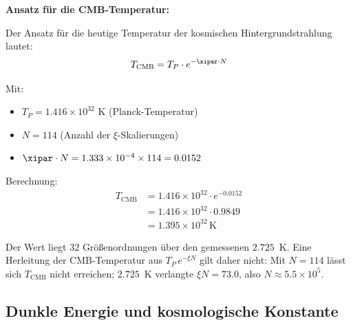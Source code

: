 	\begin{anwendung}
		\textbf{Ansatz für die CMB-Temperatur:}

		Der Ansatz für die heutige Temperatur der kosmischen Hintergrundstrahlung lautet:
		\begin{equation}
			T_{\text{CMB}} = T_P \cdot e^{-\xipar \cdot N}
		\end{equation}
		
		Mit:
		\begin{itemize}
			\item $T_P = 1.416 \times 10^{32}$ K (Planck-Temperatur)
			\item $N = 114$ (Anzahl der $\xi$-Skalierungen)
			\item $\xipar \cdot N = 1.333 \times 10^{-4} \times 114 = 0.0152$
		\end{itemize}
		
		Berechnung:
		\begin{align}
			T_{\text{CMB}} &= 1.416 \times 10^{32} \cdot e^{-0.0152} \\
			&= 1.416 \times 10^{32} \cdot 0.9849 \\
			&= 1.395 \times 10^{32}\, \text{K}
		\end{align}
		
		Der Wert liegt $32$ Größenordnungen über den gemessenen $2.725$~K. Eine Herleitung der CMB-Temperatur aus $T_P\,e^{-\xi N}$ gilt daher nicht: Mit $N = 114$ lässt sich $T_{\text{CMB}}$ nicht erreichen; $2.725$~K verlangte $\xi N = 73.0$, also $N \approx 5.5\times10^{5}$.
	\end{anwendung}
	
	\subsection{Dunkle Energie und kosmologische Konstante}
	

